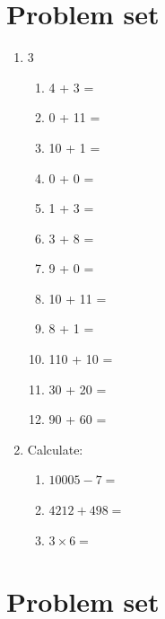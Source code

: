 \documentclass{tufte-book}
\begin{document}
\clearpage\section{Problem set }
\begin{enumerate}
\item
  \begin{multicols}{3}
    \begin{enumerate}\bigskip
      \item 4 + 3 = \dotfill\bigskip
      \item 0 + 11 = \dotfill\bigskip
      \item 10 + 1 = \dotfill\bigskip
      \item 0 + 0 = \dotfill
      \item 1 + 3 = \dotfill\bigskip
      \item 3 + 8 = \dotfill\bigskip
      \item 9 + 0 = \dotfill\bigskip
      \item 10 + 11 = \dotfill
      \item 8 + 1 = \dotfill\bigskip
      \item 110 + 10 = \dotfill\bigskip
      \item 30 + 20 = \dotfill\bigskip
      \item 90 + 60 = \dotfill
    \end{enumerate}
  \end{multicols}
  \item Calculate:
  \begin{enumerate}\bigskip
    \item $10005 - 7=$\dotfill\bigskip
    \item $4212 + 498=$\dotfill\bigskip
    \item $3 \times 6=$\dotfill\bigskip
  \end{enumerate}
\end{enumerate}

\clearpage\section{Problem set }
\end{document}
